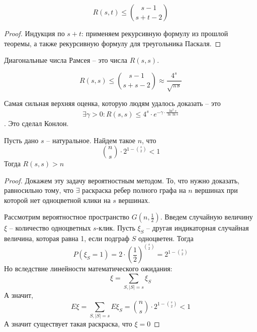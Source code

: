 \documentclass[document.tex]{subfiles}
\begin{document}
\begin{corollary}
	\[
		R(s, t) \leq \binom{s - 1}{s + t - 2}
	\]
\end{corollary}

\begin{proof}
	Индукция по $s + t$: применяем рекурсивную формулу из прошлой теоремы, а также рекурсивную формулу для треугольника Паскаля.
\end{proof}

\begin{definition}
	Диагональные числа Рамсея -- это числа $R(s, s)$.
\end{definition}

\begin{corollary}[из следствия]
	\[
		R(s, s) \leq \binom{s - 1}{s + s -2} \approx \frac{4^s}{\sqrt{\pi s}}
	\]
\end{corollary}


\begin{remark}
    Самая сильная верхняя оценка, которую людям удалось доказать -- это $$\exists \gamma > 0 : R(s, s) \leq 4^s \cdot e^{-\gamma \cdot \frac{\ln^2
    s}{\ln \ln s}}$$. Это сделал Конлон. 
    
\end{remark}

\begin{theorem}
	Пусть дано $s$ -- натуральное. Найдем такое $n$, что
	\[
		\binom{n}{s} \cdot 2^{1-\binom{s}{2}} < 1
	\] Тогда $R(s, s) > n$
\end{theorem}

\begin{proof}
	Докажем эту задачу вероятностным методом. То, что нужно доказать, равносильно тому, что $\exists$ раскраска ребер полного графа на $n$ вершинах при которой нет одноцветной клики на $s$ вершинах.

	Рассмотрим вероятностное пространство $G(n, \frac{1}{2})$.
	Введем случайную величину $\xi$ -- количество одноцветных $s$-клик. Пусть $\xi_S$ -- другая индикаторная случайная величина, которая равна 1, если подграф $S$ одноцветен. Тогда
	\[
		P(\xi_S = 1) = 2 \cdot \left(\frac{1}{2}\right)^{\binom{s}{2}} = 2^{1-\binom{s}{2}}
	\]
	Но вследствие линейности математического ожидания:
	\[
		\xi = \sum_{S, |S| = s} \xi_S
	\]
	А значит,
	\[
		E\xi = \sum_{S, |S| = s} E\xi_S = \binom{n}{s} \cdot 2^{1-\binom{s}{2}} < 1
	\]
	А значит существует такая раскраска, что $\xi = 0$
\end{proof}
\end{document}
